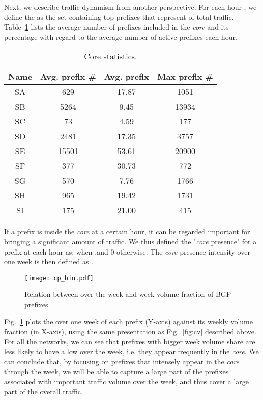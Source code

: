 \documentclass[10pt, conference,letterpaper]{IEEEtran}
\begin{document}
Next, we describe traffic dynamism from another perspective:
For each hour , we define the  as the set containing top prefixes that represent  of total traffic. 
Table~\ref{tab:core_size} lists the average number of prefixes included in the \textit{core} and its percentage with regard to the average number of active prefixes each hour. 


\begin{table}[!tb]
\centering
\begin{tabular}{cccc}\toprule
\textbf{Name} & \textbf{Avg. prefix \#} & \textbf{Avg. prefix } & \textbf{Max prefix \#}\\
\midrule
SA & 629  & 17.87  & 1051\\
SB & 5264 & 9.45  & 13934\\
SC & 73  & 4.59    & 177\\
SD & 2481  & 17.35 & 3757\\
SE & 15501  & 53.61 & 20900\\
SF & 377  & 30.73    & 772\\
SG & 570 & 7.76    & 1766\\
SH & 965  & 19.42   & 1731\\
SI & 175  & 21.00    & 415\\
\bottomrule
\end{tabular}
\caption{Core statistics.}
\label{tab:core_size}
\end{table}

If a prefix is inside the \textit{core} at a certain hour, it can be regarded important for bringing a significant amount of traffic.
We thus defined the "\textit{core} presence" for a prefix  at each hour  as:
 when  ,and 0 otherwise. The \textit{core} presence intensity over one week  is then defined as .


\begin{figure}[!tb]
\centering
\texttt{[image: cp\_bin.pdf]}
\caption{Relation between  over the week and week volume fraction of BGP prefixes. 
}
\label{fig:cpi}
\end{figure}

Fig.~\ref{fig:cpi} plots the  over one week of each prefix (Y-axis) against its weekly volume fraction (in X-axis), using the same presentation as Fig.~\ref{fig:cv} described above.
For all the networks, we can see that prefixes with bigger week volume share are less likely to have a low  over the week, i.e. they appear frequently in the \textit{core}.
We can conclude that, by focusing on prefixes that intensely appear in the \textit{core} through the week, we will be able to capture a large part of the prefixes associated with important traffic volume over the week, and thus cover a large part of the overall traffic.
\end{document}
